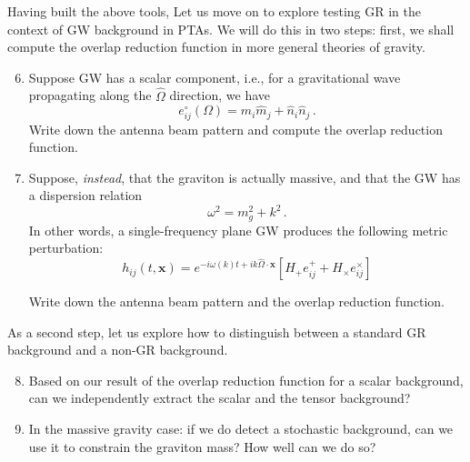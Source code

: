 \documentclass[article, onecolumn, ,nofootinbib,nopreprintnumbers]{revtex4}
\begin{document}
Having built the above tools, Let us move on to explore testing GR in the context of GW background in PTAs.  We will do this in two steps: first, we shall compute the overlap reduction function in more general theories of gravity.  
\begin{enumerate}
\setcounter{enumi}{5}
\item Suppose GW has a scalar component, i.e., for a gravitational wave propagating along the $\hat\Omega$ direction, we have 
\begin{equation}
e^{\circ}_{ij}(\Omega)=\hat m_i\hat m_j+\hat n_i \hat n_j\,.
\end{equation}
Write down the antenna beam pattern and compute the overlap reduction function.  
\item Suppose, {\it instead}, that the graviton is actually massive, and that the GW has a dispersion relation 
\begin{equation}
\omega^2 = m_g^2 +k^2\,.
\end{equation}
In other words, a single-frequency plane GW produces the following metric perturbation: 
\begin{equation}
h_{ij} (t,\mathbf{x}) = e^{-i\omega(k) t+ i k\hat\Omega\cdot\mathbf{x}} \left[
H_+ e^{+}_{ij} +
H_\times e^{\times}_{ij}\right]
\end{equation}

Write down the antenna beam pattern and the overlap reduction function. 
\end{enumerate}
As a second step, let us explore how to distinguish between a standard GR background and a non-GR background. 
\begin{enumerate}
\setcounter{enumi}{7}
\item Based on our result of the overlap reduction function for a scalar background, can we independently extract the scalar and the tensor background?  
\item In the massive gravity case: if we do detect a stochastic background, can we use it to constrain the graviton mass?  How well can we do so?
\end{enumerate}



\end{document}
